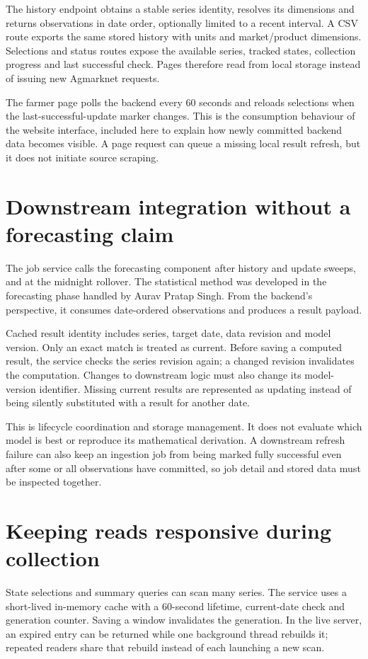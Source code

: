 \documentclass[12pt,a4paper,oneside]{report}
\newcommand{\auravname}{Aurav Pratap Singh}
\numberwithin{equation}{chapter}
\numberwithin{figure}{chapter}
\numberwithin{table}{chapter}
\theoremstyle{definition}
\begin{document}
The history endpoint obtains a stable series identity, resolves its dimensions and returns observations in date order, optionally limited to a recent interval. A CSV route exports the same stored history with units and market/product dimensions. Selections and status routes expose the available series, tracked states, collection progress and last successful check. Pages therefore read from local storage instead of issuing new Agmarknet requests.

The farmer page polls the backend every 60 seconds and reloads selections when the last-successful-update marker changes. This is the consumption behaviour of the website interface, included here to explain how newly committed backend data becomes visible. A page request can queue a missing local result refresh, but it does not initiate source scraping.

\section{Downstream integration without a forecasting claim}
The job service calls the forecasting component after history and update sweeps, and at the midnight rollover. The statistical method was developed in the forecasting phase handled by \auravname. From the backend's perspective, it consumes date-ordered observations and produces a result payload.

Cached result identity includes series, target date, data revision and model version. Only an exact match is treated as current. Before saving a computed result, the service checks the series revision again; a changed revision invalidates the computation. Changes to downstream logic must also change its model-version identifier. Missing current results are represented as updating instead of being silently substituted with a result for another date.

This is lifecycle coordination and storage management. It does not evaluate which model is best or reproduce its mathematical derivation. A downstream refresh failure can also keep an ingestion job from being marked fully successful even after some or all observations have committed, so job detail and stored data must be inspected together.

\section{Keeping reads responsive during collection}
State selections and summary queries can scan many series. The service uses a short-lived in-memory cache with a 60-second lifetime, current-date check and generation counter. Saving a window invalidates the generation. In the live server, an expired entry can be returned while one background thread rebuilds it; repeated readers share that rebuild instead of each launching a new scan.
\end{document}
